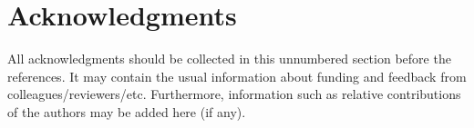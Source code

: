 \documentclass[article]{jdssv}
\begin{document}
\section*{Acknowledgments}

All acknowledgments should be collected in this
unnumbered section before the references. It may contain the usual information
about funding and feedback from colleagues/reviewers/etc. Furthermore,
information such as relative contributions of the authors may be added here
(if any).







\newpage
\end{document}
